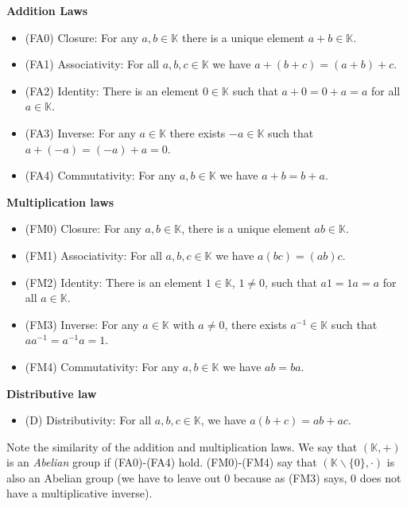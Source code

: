 \documentclass{article}
\theoremstyle{definition}
\begin{document}
\bigskip
\noindent
{\bf Addition Laws}
\smallskip
\begin{itemize}
\item [] (FA0) Closure: For any $a,b \in \mathbb{K}$ there is a 
               unique element $a+b \in \mathbb{K}$.
\item [] (FA1) Associativity: For all $a,b,c \in \mathbb{K}$ we have 
               $a+(b+c) = (a+b)+c$.
\item [] (FA2) Identity: There is an element $0 \in \mathbb{K}$ 
               such that $a+0= 0+a = a$ for all  $a \in \mathbb{K}$.
\item [] (FA3) Inverse: For any $a \in \mathbb{K}$ there exists 
               $-a \in \mathbb{K}$ such that $a+(-a) = (-a)+a = 0$.
\item [] (FA4) Commutativity: For any $a,b \in \mathbb{K}$ we have $a+b = b+a$.
\end{itemize}



\medskip
\noindent
{\bf Multiplication laws}
\smallskip
\begin{itemize}
\item [] (FM0) Closure: For any $a, b \in \mathbb{K}$, there is a unique element 
               $ab \in \mathbb{K}$.
\item [] (FM1) Associativity: For all $a,b,c \in \mathbb{K}$ we have $a(bc)=(ab)c$.
\item [] (FM2) Identity: There is an element $1 \in \mathbb{K}$, $1 \ne 0$,
               such that $a1 = 1a = a$ for all $a \in \mathbb{K}$.
\item [] (FM3) Inverse: For any $a \in \mathbb{K}$ with $a \ne 0$, there exists 
               $a^{-1} \in \mathbb{K}$ such that $aa^{-1} = a^{-1}a = 1$.
\item [] (FM4) Commutativity: For any $a,b \in \mathbb{K}$ we have $ab=ba$.
\end{itemize}

\medskip
\noindent
{\bf Distributive law}
\smallskip
\begin{itemize}
\item [] (D) Distributivity: For all $a,b,c \in \mathbb{K}$, we
have $a(b+c) = ab+ac$. 
\end{itemize}

\bigskip
\noindent
Note the similarity of the addition and multiplication laws. We
say that $(\mathbb{K},+)$ is an \emph{Abelian} group if
(FA0)-(FA4) hold.  (FM0)-(FM4) say that $(\mathbb{K} \backslash
\{0\}, \cdot)$ is also an Abelian group (we have to leave out $0$
because as (FM3) says, $0$ does not have a multiplicative
inverse).
\end{document}
